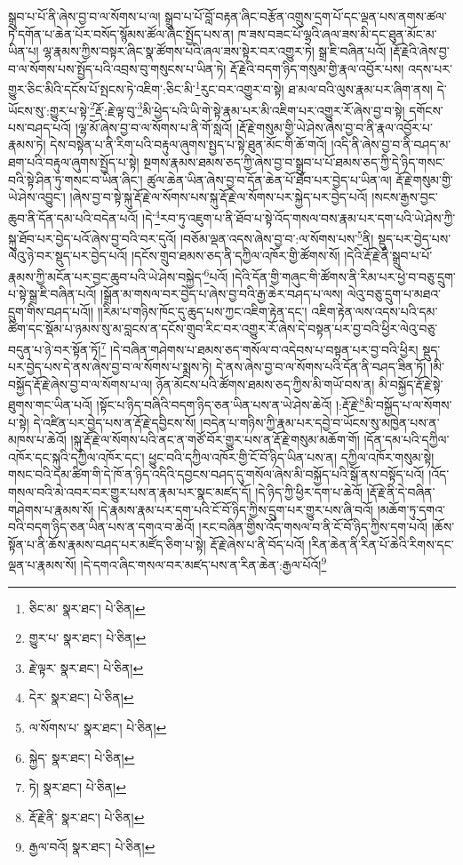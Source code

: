 སྒྲུབ་པ་པོ་ནི་ཞེས་བྱ་བ་ལ་སོགས་པ་ལ། སྒྲུབ་པ་པོ་བློ་བརྟན་ཞིང་བརྩོན་འགྲུས་དྲག་པོ་དང་ལྡན་པས་ནགས་ཚལ་ཏེ་དགོན་པ་ཆེན་པོར་བསོད་སྙོམས་ཚོལ་ཞིང་སྤྱོད་པས་ན། ཁ་ཟས་བཟང་པོ་ལྷའི་ཞལ་ཟས་མི་དང་ཐུན་མོང་མ་ཡིན་པ། ལྷ་རྣམས་ཀྱིས་བསྟར་ཞིང་སྣ་ཚོགས་པའི་ཞལ་ཟས་སྟེར་བར་འགྱུར་ཏེ། སྒྲ་ཇི་བཞིན་པའོ། །རྡོ་རྗེའི་ཞེས་བྱ་བ་ལ་སོགས་པས་སྤྱོད་པའི་འབྲས་བུ་གསུངས་པ་ཡིན་ཏེ། རྡོ་རྗེའི་བདག་ཉིད་གསུམ་གྱི་རྣལ་འབྱོར་པས། འདས་པར་གྱུར་ཅིང་མིའི་དངོས་པོ་སྤངས་ཏེ་འཇིག་:ཅིང་མི་\footnote{ཅིང་མ་  སྣར་ཐང་།  པེ་ཅིན། }རུང་བར་འགྱུར་བ་སྟེ། ཐ་མལ་བའི་ལུས་རྣམ་པར་ཞིག་ནས། དེ་ཡོངས་སུ་:གྱུར་པ་སྟེ་\footnote{གྱུར་པ་  སྣར་ཐང་།  པེ་ཅིན། }རྡོ་:རྗེ་ལྟ་བུ་\footnote{རྗེ་ལྟར་  སྣར་ཐང་།  པེ་ཅིན། }མི་ཕྱེད་པའི་ཡི་གེ་སྟེ་རྣམ་པར་མི་འཇིག་པར་འགྱུར་རོ་ཞེས་བྱ་བ་སྟེ། དགོངས་པས་བཤད་པའོ། །ལྷ་མོ་ཞེས་བྱ་བ་ལ་སོགས་པ་ནི་གོ་སླའོ། །རྡོ་རྗེ་གསུམ་གྱི་ཡེ་ཤེས་ཞེས་བྱ་བ་ནི་རྣལ་འབྱོར་པ་རྣམས་ཏེ། དེས་བསྟེན་པ་ནི་རིག་པའི་བརྟུལ་ཞུགས་སྤྱད་པ་སྟེ་ཐུན་མོང་གི་ཆོ་གའོ། །འདི་ནི་ཞེས་བྱ་བ་ནི་བཤད་མ་ཐག་པའི་བརྟུལ་ཞུགས་སྤྱོད་པ་སྟེ། སྔགས་རྣམས་ཐམས་ཅད་ཀྱི་ཞེས་བྱ་བ་སྒྲུབ་པ་པོ་ཐམས་ཅད་ཀྱི་དེ་ཉིད་གསང་བའི་སྟེ་ཤིན་ཏུ་གསང་བ་ཡིན་ཞིང་། ཚུལ་ཆེན་ཡིན་ཞེས་བྱ་བ་དོན་ཆེན་པོ་ཐོབ་པར་བྱེད་པ་ཡིན་ལ། རྡོ་རྗེ་གསུམ་གྱི་ཡེ་ཤེས་འབྱུང་། །ཞེས་བྱ་བ་སྟེ་སྐུ་རྡོ་རྗེ་ལ་སོགས་པས་སྐུ་རྡོ་རྗེ་ལ་སོགས་པར་སྐྱེད་པར་བྱེད་པའོ། །སངས་རྒྱས་བྱང་ཆུབ་ནི་དོན་དམ་པའི་བདེན་པའོ། །དེ་\footnote{དེར་  སྣར་ཐང་།  པེ་ཅིན། }རབ་ཏུ་འཇུག་པ་ནི་ཐོབ་པ་སྟེ་འོད་གསལ་བས་རྣམ་པར་དག་པའི་ཡེ་ཤེས་ཀྱི་སྐུ་ཐོབ་པར་བྱེད་པའོ་ཞེས་བྱ་བའི་བར་དུའོ། །བཅོམ་ལྡན་འདས་ཞེས་བྱ་བ་:ལ་སོགས་པས་\footnote{ལ་སོགས་པ་  སྣར་ཐང་།  པེ་ཅིན། }ནི། སྡུད་པར་བྱེད་པས་ལེའུ་ཉེ་བར་སྡུད་པར་བྱེད་པའོ། །དངོས་གྲུབ་ཐམས་ཅད་ནི་དཀྱིལ་འཁོར་གྱི་ཚོགས་སོ། །དེའི་རྡོ་རྗེ་ནི་སྒྲུབ་པ་པོ་རྣམས་ཀྱི་མངོན་པར་བྱང་ཆུབ་པའི་ཡེ་ཤེས་བསྐྱེད་\footnote{སྐྱེད་  སྣར་ཐང་།  པེ་ཅིན། }པའོ། །དེའི་དོན་གྱི་གཞུང་གི་ཚོགས་ནི་རིམ་པར་ཕྱེ་བ་བཅུ་དྲུག་པ་སྟེ་སྒྲ་ཇི་བཞིན་པའོ། །སྒྲོན་མ་གསལ་བར་བྱེད་པ་ཞེས་བྱ་བའི་རྒྱ་ཆེར་བཤད་པ་ལས། ལེའུ་བཅུ་དྲུག་པ་མཐའ་དྲུག་གིས་བཤད་པའོ།། །།རིམ་པ་གཉིས་ཁོང་དུ་ཆུད་པས་ཀྱང་འཇིག་རྟེན་དང་། འཇིག་རྟེན་ལས་འདས་པའི་དམ་ཚིག་དང་སྡོམ་པ་ཉམས་སུ་མ་བླངས་ན་དངོས་གྲུབ་རིང་བར་འགྱུར་རོ་ཞེས་དེ་བསྟན་པར་བྱ་བའི་ཕྱིར་ལེའུ་བཅུ་བདུན་པ་ཉེ་བར་སྟོན་ཏོ།\footnote{ཏེ།  སྣར་ཐང་།  པེ་ཅིན། } །དེ་བཞིན་གཤེགས་པ་ཐམས་ཅད་གསོལ་བ་འདེབས་པ་བསྟན་པར་བྱ་བའི་ཕྱིར། སྡུད་པར་བྱེད་པས་དེ་ནས་ཞེས་བྱ་བ་ལ་སོགས་པ་སྨྲས་ཏེ། དེ་ནས་ཞེས་བྱ་བ་ལ་སོགས་པའི་དོན་ནི་བཤད་ཟིན་ཏོ། །མི་བསྐྱོད་རྡོ་རྗེ་ཞེས་བྱ་བ་ལ་སོགས་པ་ལ། ཉོན་མོངས་པའི་ཚོགས་ཐམས་ཅད་ཀྱིས་མི་གཡོ་བས་ན། མི་བསྐྱོད་རྡོ་རྗེ་སྟེ་ཐུགས་གང་ཡིན་པའོ། །སྟོང་པ་ཉིད་བཞིའི་བདག་ཉིད་ཅན་ཡིན་པས་ན་ཡེ་ཤེས་ཆེའོ། །:རྡོ་རྗེ་\footnote{རྡོ་རྗེ་ནི་  སྣར་ཐང་།  པེ་ཅིན། }མི་བསྐྱོད་པ་ལ་སོགས་པ་སྟེ། དེ་འཛིན་པར་བྱེད་པས་ན་རྡོ་རྗེ་དབྱིངས་སོ། །བདེན་པ་གཉིས་ཀྱི་རྣམ་པར་དབྱེ་བ་ཡོངས་སུ་མཁྱེན་པས་ན་མཁས་པ་ཆེའོ། །སྐུ་རྡོ་རྗེ་ལ་སོགས་པའི་ནང་ན་གཙོ་བོར་གྱུར་པས་ན་རྡོ་རྗེ་གསུམ་མཆོག་གོ། །དོན་དམ་པའི་དཀྱིལ་འཁོར་དང་སྐུའི་དཀྱིལ་འཁོར་དང་། ཕྱུང་བའི་དཀྱིལ་འཁོར་གྱི་ངོ་བོ་ཉིད་ཡིན་པས་ན། དཀྱིལ་འཁོར་གསུམ་སྟེ། གསང་བའི་དམ་ཚིག་གི་དེ་ཁོ་ན་ཉིད་འདིའི་དབྱངས་བཤད་དུ་གསོལ་ཞེས་མི་བསྐྱོད་པའི་སྒོ་ནས་བསྟོད་པའོ། །འོད་གསལ་བའི་མེ་འབར་བར་གྱུར་པས་ན་རྣམ་པར་སྣང་མཛད་དོ། །དེ་ཉིད་ཀྱི་ཕྱིར་དག་པ་ཆེའོ། །རྡོ་རྗེ་ནི་དེ་བཞིན་གཤེགས་པ་རྣམས་སོ། །དེ་རྣམས་རྣམ་པར་དག་པའི་ངོ་བོ་ཉིད་ཀྱིས་དྲུག་པར་གྱུར་པས་ཞི་བའོ། །མཆོག་ཏུ་དགའ་བའི་བདག་ཉིད་ཅན་ཡིན་པས་ན་དགའ་བ་ཆེའོ། །རང་བཞིན་གྱིས་འོད་གསལ་བ་ནི་ངོ་བོ་ཉིད་ཀྱིས་དག་པའོ། །ཆོས་སྟོན་པ་ནི་ཆོས་རྣམས་བཤད་པར་མཛོད་ཅིག་པ་སྟེ། རྡོ་རྗེ་ཞེས་པ་ནི་བོད་པའོ། །རིན་ཆེན་ནི་རིན་པོ་ཆེའི་རིགས་དང་ལྡན་པ་རྣམས་སོ། །དེ་དགའ་ཞིང་གསལ་བར་མཛད་པས་ན་རིན་ཆེན་:རྒྱལ་པོའོ།\footnote{རྒྱལ་བའོ།  སྣར་ཐང་།  པེ་ཅིན། } 